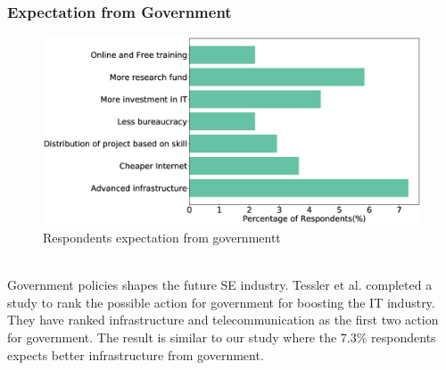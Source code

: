 \subsubsection{Expectation from Government}
\label{Expectation from Government}
\begin{figure}[htbp]
\includegraphics[scale=0.28]{Figures/GovernmentExpectation.eps} 
\caption{Respondents expectation from governmentt}
\label{fig:government expectation}
\end{figure}
\hfill\\
Government policies shapes the future SE industry. Tessler et al.\citep{Tessler2003} completed a study to rank the possible action for government for boosting the IT industry. They have ranked infrastructure and telecommunication as the first two action for government. The result is similar to our study where the 7.3\% respondents  expects  better infrastructure from government.
